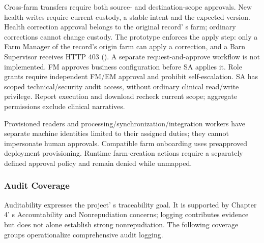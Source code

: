 Cross-farm transfers require both source- and destination-scope
approvals. New health writes require current custody, a stable intent
and the expected version. Health correction approval belongs to the
original record' s farm; ordinary corrections cannot
change custody. The prototype enforces the apply step: only a Farm
Manager of the record's origin farm can apply a correction, and a Barn
Supervisor receives HTTP 403 (). A separate
request-and-approve workflow is not implemented. FM approves business configuration before SA applies it.
Role grants require independent FM/EM approval and prohibit
self-escalation. SA has scoped technical/security audit access, without
ordinary clinical read/write privilege. Report execution and download
recheck current scope; aggregate permissions exclude clinical
narratives.

Provisioned readers and processing/synchronization/integration workers
have separate machine identities limited to their assigned duties; they
cannot impersonate human approvals. Compatible farm onboarding uses
preapproved deployment provisioning. Runtime farm-creation actions
require a separately defined approval policy and remain denied while
unmapped.

\subsubsection{Audit Coverage}\label{sec:2.2.4}

Auditability expresses the project' s traceability goal.
It is supported by Chapter 4' s Accountability and
Nonrepudiation concerns; logging contributes evidence
but does not alone establish strong nonrepudiation. The following
coverage groups operationalize comprehensive audit logging.


